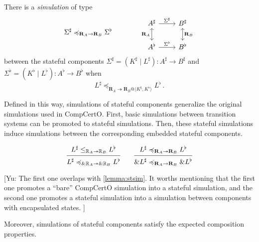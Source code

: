 \documentclass[acmsmall,screen,review,anonymous]{acmart}
\renewcommand{\preceq}{\preccurlyeq}
\begin{document}
\begin{definition}[Simulation] \label{def:ssim} %
There is a \emph{simulation} of type
\[
  \Sigma^\sharp \preceq_{\mathbf{R}_A \rightarrow \mathbf{R}_B} \Sigma^\flat
  \qquad \qquad
\begin{tikzcd}
  A^\sharp \ar[r, "\Sigma^\sharp"]
      \ar[d, leftrightarrow, "\mathbf{R}_A"'] &
  B^\sharp \ar[d, leftrightarrow, "\mathbf{R}_B"] \\
  A^\flat \ar[r, "\Sigma^\flat"] &
  B^\flat
\end{tikzcd}
\]
between
the stateful components
$\Sigma^\sharp = (K^\sharp \mid L^\sharp) : A^\sharp \rightarrow B^\sharp$ and
$\Sigma^\flat = (K^\flat \mid L^\flat) : A^\flat \rightarrow B^\flat$
when
\[
  L^\sharp
  \preceq_{\mathbf{R}_A \twoheadrightarrow
           \mathbf{R}_B@\langle K^\sharp, K^\flat \rangle}
  L^\flat
  \,.
\]
\end{definition}

Defined in this way,
simulations of stateful components generalize
the original simulations used in CompCertO.
First,
basic simulations between transition systems
can be promoted to stateful simulations.
Then,
these stateful simulations induce
simulations between the corresponding
embedded stateful components.

\begin{lemma} \label{thm:promote} %
\[
  \begin{prooftree}
    \hypo{L^\sharp
      \le_{\mathbb{R}_A \twoheadrightarrow \mathbb{R}_B}
      L^\flat}
    \infer1{L^\sharp
      \preceq_{\&\mathbb{R}_A \twoheadrightarrow \&\mathbb{R}_B}
      L^\flat}
  \end{prooftree}
  \qquad
  \begin{prooftree}
    \hypo{L^\sharp
      \preceq_{\mathbf{R}_A \twoheadrightarrow \mathbf{R}_B}
      L^\flat}
    \infer1{\&L^\sharp
      \preceq_{\mathbf{R}_A \rightarrow \mathbf{R}_B}
      \&L^\flat}
  \end{prooftree}
\]
\end{lemma}
[Yu:
The first one overlaps with \ref{lemma:stsim}.
It worths mentioning that the first one promotes
a ``bare'' CompCertO simulation into a stateful simulation,
and the second one promotes
a stateful simulation into
a simulation between components with encapsulated states.
]

Moreover,
simulations of stateful components satisfy the expected
composition properties.
\end{document}
